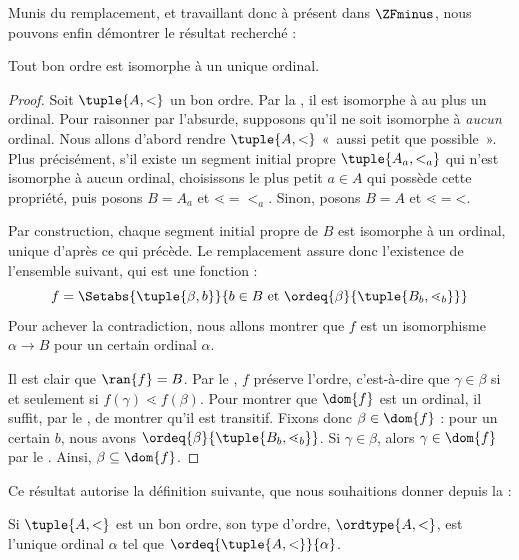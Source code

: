 \documentclass[../../../include/open-logic-section]{subfiles}
\begin{document}

Munis du remplacement, et travaillant donc à présent dans
$\ZFminus$, nous pouvons enfin démontrer le résultat recherché :

\begin{thm}
Tout bon ordre est isomorphe à un unique ordinal.
\end{thm}

\begin{proof}
Soit $\tuple{A, <}$ un bon ordre. Par la
, il est isomorphe à au plus un ordinal.
Pour raisonner par l'absurde, supposons qu'il ne soit isomorphe à
\emph{aucun} ordinal. Nous allons d'abord rendre $\tuple{A, <}$
«~aussi petit que possible~». Plus précisément, s'il existe un
segment initial propre $\tuple{A_a, <_a}$ qui n'est isomorphe à
aucun ordinal, choisissons le plus petit $a \in A$ qui possède cette
propriété, puis posons $B = A_a$ et $\mathord{\lessdot} =
\mathord{<_a}$. Sinon, posons $B = A$ et $\mathord{\lessdot} =
\mathord{<}$.

Par construction, chaque segment initial propre de $B$ est isomorphe
à un ordinal, unique d'après ce qui précède. Le remplacement assure
donc l'existence de l'ensemble suivant, qui est une fonction :
\[
	f = \Setabs{\tuple{\beta, b}}{b \in B\text{ et }\ordeq{\beta}{\tuple{B_b, \lessdot_b}}}
\]
Pour achever la contradiction, nous allons montrer que $f$ est un
isomorphisme $\alpha \to B$ pour un certain ordinal $\alpha$.

Il est clair que $\ran{f} = B$. Par le
, $f$ préserve l'ordre, c'est-à-dire que
$\gamma \in \beta$ si et seulement si
$f(\gamma) \lessdot f(\beta)$. Pour montrer que $\dom{f}$ est un
ordinal, il suffit, par le , de
montrer qu'il est transitif. Fixons donc $\beta \in \dom{f}$ : pour
un certain $b$, nous avons
$\ordeq{\beta}{\tuple{B_b, \lessdot_b}}$. Si
$\gamma \in \beta$, alors $\gamma \in \dom{f}$ par le
. Ainsi,
$\beta \subseteq \dom{f}$.
\end{proof}

Ce résultat autorise la définition suivante, que nous souhaitions
donner depuis la  :

\begin{defn}
Si $\tuple{A, <}$ est un bon ordre, son type d'ordre,
$\ordtype{A, <}$, est l'unique ordinal $\alpha$ tel que
$\ordeq{\tuple{A, < }}{\alpha}$.
\end{defn}
\end{document}
